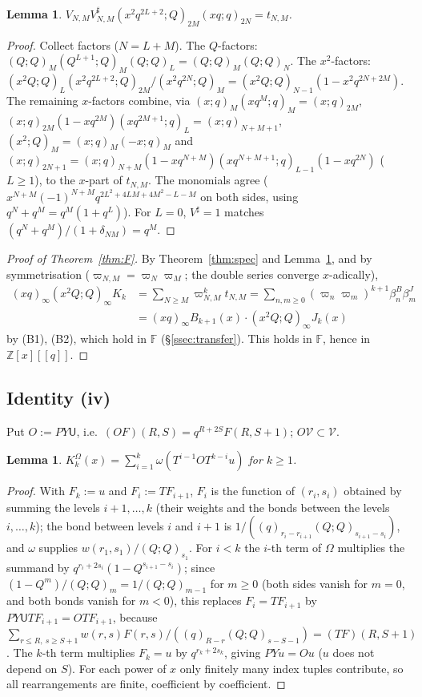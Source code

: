 \documentclass[11pt]{amsart}
\newtheorem{lemma}[theorem]{Lemma}
\theoremstyle{definition}
\numberwithin{equation}{section}
\newcommand{\Z}{\mathbb{Z}}
\begin{document}
\begin{lemma}\label{lem:prod}
$V_{N,M}V^\sharp_{N,M}(x^2q^{2L+2};Q)_{2M}(xq;q)_{2N}=t_{N,M}$.
\end{lemma}
\begin{proof}
Collect factors ($N=L+M$). The $Q$-factors: $(Q;Q)_M(Q^{L+1};Q)_M(Q;Q)_L=(Q;Q)_M(Q;Q)_N$. The $x^2$-factors:
$(x^2Q;Q)_L(x^2q^{2L+2};Q)_{2M}/(x^2q^{2N};Q)_M=(x^2Q;Q)_{N-1}(1-x^2q^{2N+2M})$. The remaining $x$-factors combine, via
$(x;q)_M(xq^M;q)_M=(x;q)_{2M}$, $(x;q)_{2M}(1-xq^{2M})(xq^{2M+1};q)_L=(x;q)_{N+M+1}$, $(x^2;Q)_M=(x;q)_M(-x;q)_M$ and
$(x;q)_{2N+1}=(x;q)_{N+M}(1-xq^{N+M})(xq^{N+M+1};q)_{L-1}(1-xq^{2N})$ ($L\ge1$), to the $x$-part of $t_{N,M}$. The monomials
agree ($x^{N+M}(-1)^{N+M}q^{2L^2+4LM+4M^2-L-M}$ on both sides, using $q^N+q^M=q^M(1+q^L)$). For $L=0$, $V^\sharp=1$
matches $(q^N+q^M)/(1+\delta_{NM})=q^M$.
\end{proof}

\begin{proof}[Proof of Theorem~\ref{thm:F}]
By Theorem~\ref{thm:spec} and Lemma~\ref{lem:prod}, and by symmetrisation ($\varpi_{N,M}=\varpi_N\varpi_M$; the double
series converge $x$-adically),
\begin{align*}
(xq)_\infty(x^2Q;Q)_\infty K_k&=\sum_{N\ge M}\varpi_{N,M}^kt_{N,M}=\sum_{n,m\ge0}(\varpi_n\varpi_m)^{k+1}\beta^B_n\beta^J_m\\
&=(xq)_\infty B_{k+1}(x)\cdot(x^2Q;Q)_\infty J_k(x)
\end{align*}
by (B1), (B2), which hold in $\mathbb F$ (§\ref{ssec:transfer}). This holds in $\mathbb F$, hence in $\Z[x][[q]]$.
\end{proof}

\subsection{Identity (iv)}\label{ssec:iv}
Put $O:=PY\mathsf U$, i.e.\ $(OF)(R,S)=q^{R+2S}F(R,S+1)$; $O\mathcal V\subset\mathcal V$.

\begin{lemma}\label{lem:Omop}
$K^\Omega_k(x)=\sum_{i=1}^k\omega(T^{i-1}OT^{k-i}u)$ for $k\ge1$.
\end{lemma}
\begin{proof}
With $F_k:=u$ and $F_i:=TF_{i+1}$, $F_i$ is the function of $(r_i,s_i)$ obtained by summing the levels $i+1,\dots,k$
(their weights and the bonds between the levels $i,\dots,k$); the bond between levels $i$ and $i+1$ is
$1/((q)_{r_i-r_{i+1}}(Q;Q)_{s_{i+1}-s_i})$, and $\omega$ supplies $w(r_1,s_1)/(Q;Q)_{s_1}$. For $i<k$ the $i$-th term of $\Omega$
multiplies the summand by $q^{r_i+2s_i}(1-Q^{s_{i+1}-s_i})$; since $(1-Q^m)/(Q;Q)_m=1/(Q;Q)_{m-1}$ for $m\ge0$ (both sides
vanish for $m=0$, and both bonds vanish for $m<0$), this replaces $F_i=TF_{i+1}$ by $PY\mathsf UTF_{i+1}=OTF_{i+1}$, because
$\sum_{r\le R,\ s\ge S+1}w(r,s)F(r,s)/((q)_{R-r}(Q;Q)_{s-S-1})=(TF)(R,S+1)$. The $k$-th term multiplies $F_k=u$ by
$q^{r_k+2s_k}$, giving $PYu=Ou$ ($u$ does not depend on $S$). For each power of $x$ only finitely many index tuples
contribute, so all rearrangements are finite, coefficient by coefficient.
\end{proof}
\end{document}
